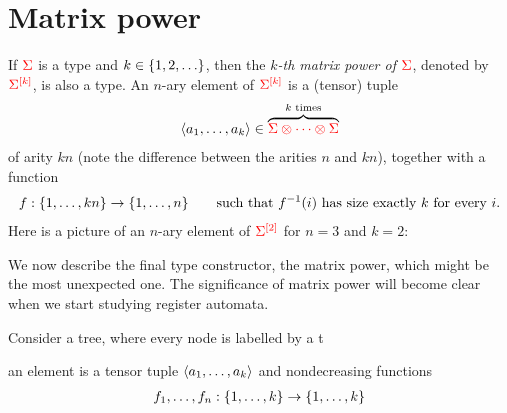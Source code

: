 \section{Matrix power}
\label{sec:matrix-power}


\begin{definition}
    If  ${\color{red}{\Sigma}}$ is a type and $k \in \{1,2,\ldots\}$, then the \emph{$k$-th matrix power of ${\color{red}{\Sigma}}$}, denoted by ${\color{red}{\Sigma^{[k]}}}$, is also a type.  An $n$-ary element of ${\color{red}{\Sigma^{[k]}}}$ is a (tensor) tuple
    \begin{align*}
        \langle{a_1,\ldots,a_k}\rangle \in \overbrace{{\color{red}{\Sigma \otimes \cdots \otimes \Sigma}}}^{\text{$k$ times}} 
    \end{align*}
    of arity $kn$ (note the difference between the arities $n$ and $kn$), together with a function
    \begin{align*}
        f : \{1,\ldots,kn\} \to \{1,\ldots,n\} \qquad \text{such that $f^{-1}(i)$ has size exactly $k$ for every $i$.}
    \end{align*}
    Here is a picture of an $n$-ary element of  ${\color{red}{\Sigma^{[2]}}}$ for $n=3$ and $k=2$:
\end{definition}
  
We now describe the final type constructor, the matrix power, which might be the most unexpected one. The significance of matrix power will become clear when we start studying register automata.  

Consider a tree, where every node is labelled by a t

an element is a tensor tuple $\langle{a_1,\ldots,a_k}\rangle$ and nondecreasing functions 
\begin{align*}
    f_1,\ldots,f_n : \{1,\ldots,k\} \to \{1,\ldots,k\}
\end{align*}

